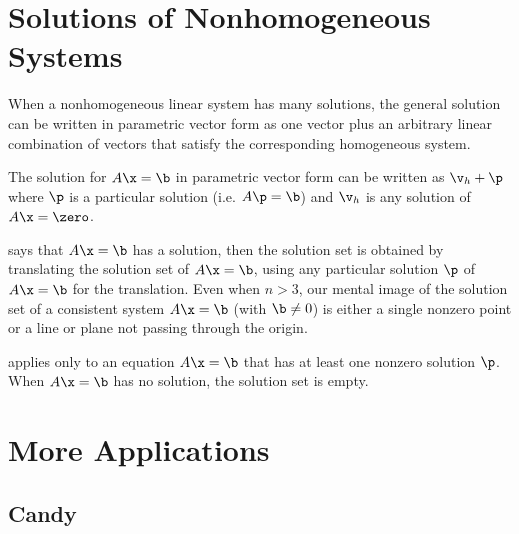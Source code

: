 
\section{Solutions of Nonhomogeneous Systems}
\label{sec:solutions_of_nonhomogeneous_systems}

When a nonhomogeneous linear system has many solutions, the general solution
can be written in parametric vector form as one vector plus an arbitrary linear
combination of vectors that satisfy the corresponding homogeneous system.

\begin{theorem}
  \label{thm:solution_in_parametric_vector_form}

  The solution for $A\x = \b$ in parametric vector form can be written as $\v_h
  + \p$ where $\p$ is a particular solution (i.e. $A\p = \b$) and $\v_h$ is any
  solution of $A\x = \zero$.
\end{theorem}

 says that $A\x = \b$ has a
solution, then the solution set is obtained by translating the solution set of
$A\x = \b$, using any particular solution $\p$ of $A\x = \b$ for the
translation. Even when $n > 3$, our mental image of the solution set of a
consistent system $A\x = \b$ (with $\b \ne 0$) is either a single nonzero point
or a line or plane not passing through the origin.

\begin{note}
  \label{nte:solution_in_parametric_vector_form}

   applies only to an equation
  $A\x = \b$ that has at least one nonzero solution $\p$. When $A\x = \b$ has
  no solution, the solution set is empty.
\end{note}


\section{More Applications}
\label{sec:more_applications}

\subsection{Candy}
\label{sub_sec:candy}

